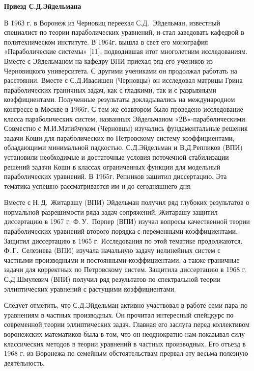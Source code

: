 {\bf Приезд С.Д.Эйдельмана}

В 196З г. в Воронеж из Черновиц переехал С.Д.~Эйдельман, известный
специалист по теории параболических уравнений, и стал заведовать
кафедрой в политехническом институте. В 1964г. вышла в свет его монография «Параболические системы» [11], подводившая итог многолетним исследованиям. Вместе с Эйдельманом на кафедру ВПИ приехал ряд его учеников из Черновицкого университета. С другими учениками он продолжал работать на расстоянии. Вместе с С.Д.Ивасишен (Черновцы) он исследовал матрицы Грина параболических граничных задач, как с гладкими, так и с разрывными коэффициентами. Полученные результаты докладывались на международном конгрессе в Москве в 1966г. С тем же соавтором было проведено исследование класса параболических систем, названных Эйдельманом «2В»-параболическими. Совместно с М.И.Матийчуком (Черновцы) изучались фундаментальные
решения задачи Коши для параболических по Петровскому систему коэффициентами, обладающими минимальной падкостью. С.Д.Эйдельман и
В.Д.Реппиков (ВПИ) установили необходимые и достаточные условия поточечной стабилизации решений задачи Коши в классах ограниченных функции для
модельный параболических уравнений. В 1965г. Репников защитил диссертацию. Эта тематика успешно рассматривается им и до сегодняшнего дня.

Вместе с Н.\,Д.~Житарашу (ВПИ) Эйдельман получил ряд глубоких результатов о нормальной разрешимости ряда задач сопряжений.
Житарашу защитил диссертацию в 1967 г.
Ф.\,У.~Порпер (ВПИ) изучал вопросы качественной теории параболических уравнений второго порядка с переменными коэффициентами.
Защитил диссертацию в 1965 г. Исследования по этой тематике продолжаются.
Ф.\,Г.~Селезнева (ВПИ) изучала начальную задачу нелинейных систем с частными производными и постоянными коэффициентами,
а также граничные задачи для корректных по Петровскому систем. Защитила диссертацию в 1968 г. С.Д.Шмулевич (ВПИ) получил ряд результатов по спектральной теории эллиптических уравнений с растущими коэффициентами.

Следует отметить, что С.Д.Эйдельман активно участвовал в работе семи пара по уравнениям в частных производных. Он прочитал интересный спейцкурс по современной теории эллиптических задач. Главная его заслуга перед коллективом воронежских математиков была в том, что он неоднократно нам показывал силу классических методов в теории уравнений в частных производных. Его отъезд в 1968 г. из Воронежа по семейным обстоятельствам прервал эту весьма полезную деятельность.

